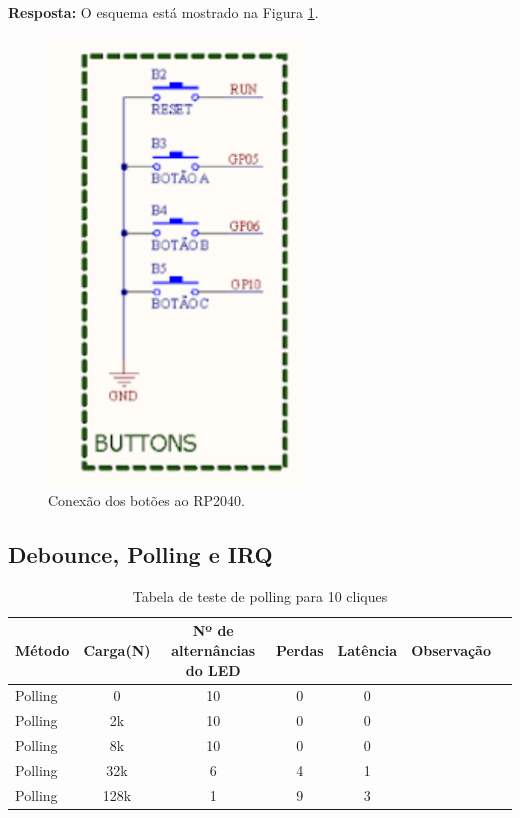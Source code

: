 \documentclass{article}
\begin{document}
\noindent
\textbf{Resposta:}  
O esquema está mostrado na Figura \ref{fig:circuito_botoes}.  

\begin{figure}[H]
    \centering
    \includegraphics[width=0.6\textwidth]{circuito_botoes.png}
    \caption{Conexão dos botões ao RP2040.}
    \label{fig:circuito_botoes}
\end{figure}

\subsection{Debounce, Polling e IRQ}

\begin{table}[H]
    \centering
    \begin{tabular}{lcccccc}
        \toprule
         Método & Carga(N) & Nº de alternâncias do LED & Perdas & Latência & Observação\\
         \midrule
         Polling & 0 & 10 & 0 & 0 & \\
         Polling & 2k & 10 & 0 & 0 & \\
         Polling & 8k & 10 & 0 & 0 & \\
         Polling & 32k & 6 & 4 & 1 & \\
         Polling & 128k & 1 &  9 & 3 & \\
         \bottomrule
    \end{tabular}
    \caption{Tabela de teste de polling para 10 cliques}
    \label{tab:polling_compair}
\end{table}
\end{document}
